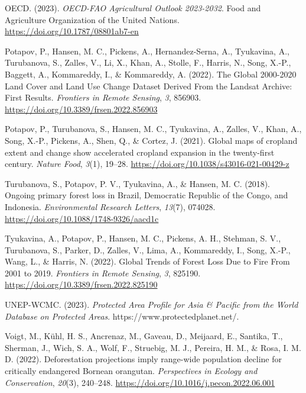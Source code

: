 \documentclass[
  letterpaper,
  DIV=11,
  numbers=noendperiod]{scrreprt}
\newlength{\cslhangindent}
\newlength{\cslentryspacingunit} %
\newenvironment{CSLReferences}[2] %
 {%
  \setlength{\parindent}{0pt}
  \ifodd #1
  \let\oldpar\par
  \def\par{\hangindent=\cslhangindent\oldpar}
  \fi
  \setlength{\parskip}{#2\cslentryspacingunit}
 }%
 {}
\begin{document}
\begin{CSLReferences}{1}{0}
\leavevmode{}%
OECD. (2023). \emph{{OECD-FAO Agricultural Outlook} 2023-2032}. {Food
and Agriculture Organization of the United Nations}.
\url{https://doi.org/10.1787/08801ab7-en}

\leavevmode{}%
Potapov, P., Hansen, M. C., Pickens, A., Hernandez-Serna, A., Tyukavina,
A., Turubanova, S., Zalles, V., Li, X., Khan, A., Stolle, F., Harris,
N., Song, X.-P., Baggett, A., Kommareddy, I., \& Kommareddy, A. (2022).
The {Global} 2000-2020 {Land Cover} and {Land Use Change Dataset Derived
From} the {Landsat Archive}: {First Results}. \emph{Frontiers in Remote
Sensing}, \emph{3}, 856903.
\url{https://doi.org/10.3389/frsen.2022.856903}

\leavevmode{}%
Potapov, P., Turubanova, S., Hansen, M. C., Tyukavina, A., Zalles, V.,
Khan, A., Song, X.-P., Pickens, A., Shen, Q., \& Cortez, J. (2021).
Global maps of cropland extent and change show accelerated cropland
expansion in the twenty-first century. \emph{Nature Food}, \emph{3}(1),
19--28. \url{https://doi.org/10.1038/s43016-021-00429-z}

\leavevmode{}%
Turubanova, S., Potapov, P. V., Tyukavina, A., \& Hansen, M. C. (2018).
Ongoing primary forest loss in {Brazil}, {Democratic Republic} of the
{Congo}, and {Indonesia}. \emph{Environmental Research Letters},
\emph{13}(7), 074028. \url{https://doi.org/10.1088/1748-9326/aacd1c}

\leavevmode{}%
Tyukavina, A., Potapov, P., Hansen, M. C., Pickens, A. H., Stehman, S.
V., Turubanova, S., Parker, D., Zalles, V., Lima, A., Kommareddy, I.,
Song, X.-P., Wang, L., \& Harris, N. (2022). Global {Trends} of {Forest
Loss Due} to {Fire From} 2001 to 2019. \emph{Frontiers in Remote
Sensing}, \emph{3}, 825190.
\url{https://doi.org/10.3389/frsen.2022.825190}

\leavevmode{}%
UNEP-WCMC. (2023). \emph{Protected {Area Profile} for {Asia} \&
{Pacific} from the {World Database} on {Protected Areas}}.
https://www.protectedplanet.net/.

\leavevmode{}%
Voigt, M., Kühl, H. S., Ancrenaz, M., Gaveau, D., Meijaard, E., Santika,
T., Sherman, J., Wich, S. A., Wolf, F., Struebig, M. J., Pereira, H. M.,
\& Rosa, I. M. D. (2022). Deforestation projections imply range-wide
population decline for critically endangered {Bornean} orangutan.
\emph{Perspectives in Ecology and Conservation}, \emph{20}(3), 240--248.
\url{https://doi.org/10.1016/j.pecon.2022.06.001}


\end{CSLReferences}
\end{document}
